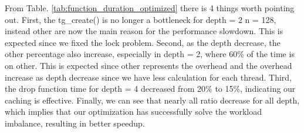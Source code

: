 From Table. \ref{tab:function_duration_optimized} there is 4 things worth pointing out. First, the tg\_create() is no longer a bottleneck for depth = 2 n = 128, instead other are now the main reason for the performance slowdown. This is expected since we fixed the lock problem. Second, as the depth decrease, the other percentage also increase, especially in depth = 2, where 60\% of the time is on other. This is expected since other represents the overhead and the overhead increase as depth decrease since we have less calculation for each thread. Third, the drop function time for depth = 4 decreased from 20\% to 15\%, indicating our caching is effective. Finally, we can see that nearly all ratio decrease for all depth, which implies that our optimization has successfully solve the workload imbalance, resulting in better speedup. 